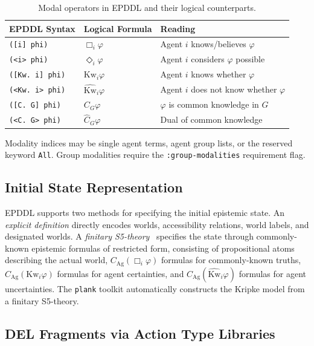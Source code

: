 \documentclass[12pt,a4paper]{article}
\theoremstyle{definition}
\theoremstyle{plain}
\begin{document}
\begin{table}[H]
\centering
\begin{tabular}{lll}
\toprule
\textbf{EPDDL Syntax} & \textbf{Logical Formula} & \textbf{Reading} \\
\midrule
\texttt{([i] phi)}    & $\Box_i \varphi$               & Agent $i$ knows/believes $\varphi$ \\
\texttt{(<i> phi)}    & $\Diamond_i \varphi$           & Agent $i$ considers $\varphi$ possible \\
\texttt{([Kw. i] phi)}& $\mathrm{Kw}_i \varphi$        & Agent $i$ knows whether $\varphi$ \\
\texttt{(<Kw. i> phi)}& $\widehat{\mathrm{Kw}}_i\varphi$ & Agent $i$ does not know whether $\varphi$ \\
\texttt{([C. G] phi)} & $C_G \varphi$                  & $\varphi$ is common knowledge in $G$ \\
\texttt{(<C. G> phi)} & $\hat{C}_G \varphi$             & Dual of common knowledge \\
\bottomrule
\end{tabular}
\caption{Modal operators in EPDDL and their logical counterparts.}
\label{tab:modalities}
\end{table}

Modality indices may be single agent terms, agent group lists, or the reserved keyword
\texttt{All}. Group modalities require the \texttt{:group-modalities} requirement flag.

\subsection{Initial State Representation}

EPDDL supports two methods for specifying the initial epistemic state. An \textit{explicit
definition} directly encodes worlds, accessibility relations, world labels, and designated worlds.
A \textit{finitary S5-theory}~\cite{son2014finitary} specifies the state through commonly-known
epistemic formulas of restricted form, consisting of propositional atoms describing the actual
world, $C_\mathrm{Ag}(\Box_i \varphi)$ formulas for commonly-known truths,
$C_\mathrm{Ag}(\mathrm{Kw}_i \varphi)$ formulas for agent certainties, and
$C_\mathrm{Ag}(\widehat{\mathrm{Kw}}_i \varphi)$ formulas for agent uncertainties. The
\texttt{plank} toolkit automatically constructs the Kripke model from a finitary S5-theory.

\subsection{DEL Fragments via Action Type Libraries}
\end{document}
